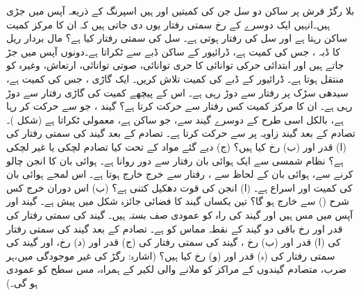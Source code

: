 بلا رگڑ فرش پر ساکن  دو سل  جن کی کمیتیں  اور  ہیں اسپرنگ کے ذریعہ آپس میں جڑی  ہیں۔انہیں ایک دوسرے کے رخ سمتی رفتار یوں  دی جاتی ہیں کہ ان کا مرکز کمیت ساکن رہتا ہے اور سل  کی  رفتار  ہوتی ہے۔ سل  کی سمتی رفتار کیا ہے؟
مال بردار  ریل کا ڈبہ  ، جس کی کمیت  ہے، ڈرائیور کے ساکن  ڈبے سے ٹکراتا ہے۔دونوں آپس میں جڑ جاتے ہیں اور ابتدائی حرکی توانائی کا   حری توانائی، صوتی توانائی، ارتعاش، وغیرہ  کو منتقل  ہوتا   ہے۔ ڈرائیور  کے ڈبے کی کمیت تلاش کریں۔
ایک گاڑی ، جس کی کمیت  ہے، سیدھی سڑک پر   رفتار سے دوڑ رہی ہے۔ اس کے پیچھے   کمیت کی گاڑی  رفتار سے دوڑ رہی ہے۔ ان کا مرکز کمیت کس رفتار سے حرکت کرتا ہے؟
 گیند   ، جو  سے حرکت کر رہا ہے،  بالکل اسی طرح  کے دوسرے گیند  سے، جو ساکن ہے، معمولی  ٹکراتا ہے (شکل )۔ تصادم کے بعد گیند   زاویہ  پر   سے حرکت کرتا ہے۔ تصادم کے بعد گیند  کی  سمتی رفتار کی (ا) قدر اور (ب) رخ کیا ہیں؟ (ج) دیے گئے مواد کے تحت کیا تصادم لچکی یا غیر لچکی ہے؟
نظام شمسی سے ایک ہوائی بان   رفتار سے  دور  روانا ہے۔ ہوائی بان کا انجن چالو کرنے سے،   ہوائی بان کے لحاظ سے ،  رفتار سے خرج  خارج  ہوتا ہے۔ اس لمحے ہوائی بان کی کمیت  اور اسراع  ہے۔ (ا)  انجن کی قوت دھکیل  کتنی ہے؟ (ب)  اس دوران خرج کس شرح () سے  خارج ہو گا؟
تین یکساں گیند  کا فضائی جائزہ شکل  میں پیش ہے۔ گیند  اور  آپس میں مس ہیں اور گیند  کی راہ کو عمودی  صف بستہ ہیں۔ گیند  کی  سمتی رفتار کی قدر   اور رخ باقی دو گیند کے نقطہ مماس     کو ہے۔ تصادم کے بعد گیند  کی سمتی رفتار کی (ا)  قدر اور (ب) رخ ، گیند  کی سمتی رفتار کی (ج) قدر اور (د) رخ، اور گیند  کی سمتی رفتار کی (ہ) قدر اور (و) رخ کیا ہیں؟ (اشارہ: رگڑ کی غیر موجودگی میں،ہر  ضرب،    متصادم گیندوں  کے مراکز  کو ملانے والی لکیر  کے ہمراہ، مس سطح کو عمودی  ہو گی۔)
